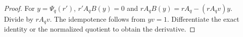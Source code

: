 \begin{proof}
For $y=\Psi_q(r')$, $r'A_qB(y)=0$ and $rA_qB(y)=rA_q-(rA_qv)y$. Divide by $rA_qv$. The idempotence follows from $yv=1$. Differentiate the exact identity or the normalized quotient to obtain the derivative.
\end{proof}
